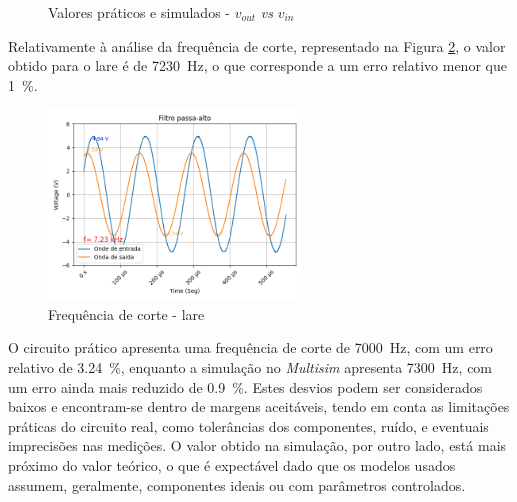 \begin{figure}[hbtp]
	\centering%
		\centering
		\qquad
		\caption{Valores práticos e simulados - $v_{out}$ \textit{vs} $v_{in}$}%
		\label{fig:simulacaoPA}%
	\end{figure}

Relativamente à análise da frequência de corte, representado na Figura \ref{fig:fcvoutlare}, o valor obtido para o \acrshort{lare} é de \SI{7230}{\hertz}, o que corresponde a um erro relativo menor que \SI{1}{\percent}.

\begin{figure}[hbtp]
	\centering
	\includegraphics[width=0.6\textwidth]{figures/filtro_passa-alto_fc_LaRE.png}
	\caption{Frequência de corte - \acrshort{lare}}
	\label{fig:fcvoutlare}
\end{figure}

O circuito prático apresenta uma frequência de corte de \SI{7000}{\hertz}, com um erro relativo de \SI{3.24}{\percent}, enquanto a simulação no \textit{Multisim} apresenta \SI{7300}{\hertz}, com um erro ainda mais reduzido de \SI{0.9}{\percent}. Estes desvios podem ser considerados baixos e encontram-se dentro de margens aceitáveis, tendo em conta as limitações práticas do circuito real, como tolerâncias dos componentes, ruído, e eventuais imprecisões nas medições. O valor obtido na simulação, por outro lado, está mais próximo do valor teórico, o que é expectável dado que os modelos usados assumem, geralmente, componentes ideais ou com parâmetros controlados.

